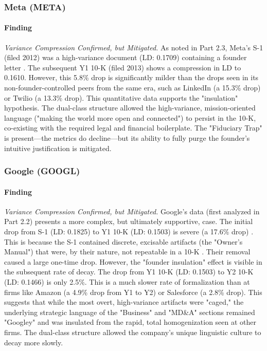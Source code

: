 \documentclass[12pt, letterpaper]{article}
\begin{document}
\subsubsection{Meta (META)}
\paragraph{Finding} \textit{Variance Compression Confirmed, but Mitigated.}
As noted in Part 2.3, Meta's S-1 (filed 2012) was a high-variance document (LD: 0.1709) containing a founder letter \cite{key6}. The subsequent Y1 10-K (filed 2013) \cite{key39} shows a compression in LD to 0.1610. However, this 5.8\% drop is significantly milder than the drops seen in its non-founder-controlled peers from the same era, such as LinkedIn (a 15.3\% drop) or Twilio (a 13.3\% drop). This quantitative data supports the "insulation" hypothesis. The dual-class structure allowed the high-variance, mission-oriented language ("making the world more open and connected") to persist in the 10-K, co-existing with the required legal and financial boilerplate. The "Fiduciary Trap" is present—the metrics do decline—but its ability to fully purge the founder's intuitive justification is mitigated.

\subsubsection{Google (GOOGL)}
\paragraph{Finding} \textit{Variance Compression Confirmed, but Mitigated.}
Google's data (first analyzed in Part 2.2) presents a more complex, but ultimately supportive, case. The initial drop from S-1 (LD: 0.1825) to Y1 10-K (LD: 0.1503) is severe (a 17.6\% drop) \cite{key2}. This is because the S-1 contained discrete, excisable artifacts (the "Owner's Manual") that were, by their nature, not repeatable in a 10-K \cite{key2}. Their removal caused a large one-time drop. However, the "founder insulation" effect is visible in the subsequent rate of decay. The drop from Y1 10-K (LD: 0.1503) \cite{key29} to Y2 10-K (LD: 0.1466) \cite{key30} is only 2.5\%. This is a much slower rate of formalization than at firms like Amazon (a 4.9\% drop from Y1 to Y2) or Salesforce (a 2.8\% drop). This suggests that while the most overt, high-variance artifacts were "caged," the underlying strategic language of the "Business" and "MD\&A" sections remained "Googley" and was insulated from the rapid, total homogenization seen at other firms. The dual-class structure allowed the company's unique linguistic culture to decay more slowly.
\end{document}
